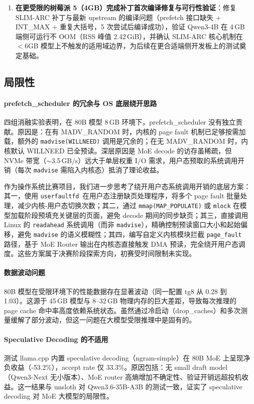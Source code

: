\begin{enumerate}
    \item \textbf{在更受限的树莓派 5（4GB）完成补丁首次编译修复与可行性验证}：修复 SLIM-ARC 补丁与最新 upstream 的编译问题（prefetch 接口缺失 + INT\_MAX + 重复大括号，5 次尝试后编译成功），验证 Qwen3-4B 在 4\,GB 端侧可运行不 OOM（RSS 峰值 2.42\,GiB），并确认 SLIM-ARC 核心机制在 $<$6GB 模型上不触发的适用域边界，为后续在更合适端侧开发板上的测试奠定基础。
\end{enumerate}

\subsection{局限性}

\paragraph{prefetch\_scheduler 的冗余与 OS 底层绕开思路}
四组消融实验表明，在 80B 模型 8\,GB 环境下，prefetch\_scheduler 没有独立贡献。原因是：在有 MADV\_RANDOM 时，内核的 page fault 机制已足够按需加载，额外的 \texttt{madvise(WILLNEED)} 调用是冗余的；在无 MADV\_RANDOM 时，内核默认 WILLNEED 已全预读。深层原因是 MoE decode 的访存虽稀疏，但 NVMe 带宽（$\sim$3.5\,GB/s）远大于单层权重 I/O 需求，用户态预取的系统调用开销（每次 \texttt{madvise} 需陷入内核态）抵消了理论收益。

作为操作系统比赛项目，我们进一步思考了绕开用户态系统调用开销的底层方案：其一，使用 \texttt{userfaultfd}~\cite{cgroupsv2}在用户态注册缺页处理程序，将多个 page fault 批量处理，减少内核-用户态切换次数；其二，通过 \texttt{mmap(MAP\_POPULATE)} 或 \texttt{mlock} 在模型加载阶段预填充关键层的页面，避免 decode 期间的同步缺页；其三，直接调用 Linux 的 \texttt{readahead} 系统调用（而非 \texttt{madvise}），精确控制预读窗口大小和起始偏移，避免 \texttt{madvise} 的语义模糊性；其四，编写自定义内核模块拦截 \texttt{page\_fault} 路径，基于 MoE Router 输出在内核态直接触发 DMA 预读，完全绕开用户态调度。这些方案属于决赛阶段探索方向，初赛受时间限制未实现。

\paragraph{数据波动问题}
80B 模型在受限环境下的性能数据存在显著波动（同一配置 tg8 从 0.28 到 1.03）。这源于 45\,GB 模型与 8--32\,GB 物理内存的巨大差距，导致每次推理的 page cache 命中率高度依赖系统状态。虽然通过冷启动（drop\_caches）和多次测量缓解了部分波动，但这一问题在大模型受限推理中是固有的。

\paragraph{Speculative Decoding 的不适用}
测试 llama.cpp 内置 speculative decoding（ngram-simple）在 80B MoE 上呈现净负收益（-53.2\%），accept rate 仅 33.3\%。原因包括：无 small draft model（Qwen3-Next 无小版本）、MoE router 高熵增加不确定性、验证开销远超投机收益。这一结果与 unsloth 对 Qwen3.6-35B-A3B 的测试一致，证实了 speculative decoding 对 MoE 大模型的局限性。

